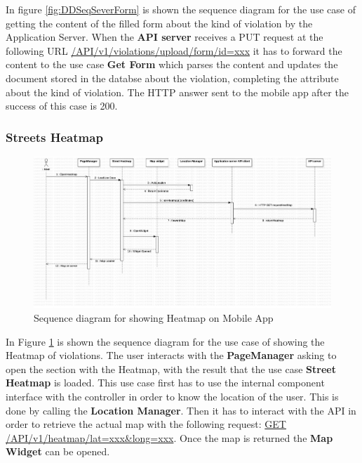In figure \ref{fig:DDSeqSeverForm} is shown the sequence diagram for the use case of getting the content of the filled form about the kind of violation by the Application Server. When the \textbf{API server} receives a PUT request at the following URL \url{/API/v1/violations/upload/form/id=xxx} it has to forward the content to the use case \textbf{Get Form} which parses the content and updates the document stored in the databse about the violation, completing the attribute about the kind of violation. The HTTP answer sent to the mobile app after the success of this case is \textcolor{poliblue}{200}.



\subsubsection{Streets Heatmap}%
\begin{figure}[H]
\centering
\includegraphics[width=\textwidth]{Images/DDSeqAppMap.png}
\caption{\label{fig:DDSeqAppMap} Sequence diagram for showing Heatmap on Mobile App}
\end{figure}

In Figure \ref{fig:DDSeqAppMap} is shown the sequence diagram for the use case of showing the Heatmap of violations.
The user interacts with the \textbf{PageManager} asking to open the section with the Heatmap, with the result that the use case \textbf{Street Heatmap} is loaded. This use case first has to use the internal component interface with the controller in order to know the location of the user. This is done by calling the \textbf{Location Manager}. Then it has to interact with the API in order to retrieve the actual map with the following request: \url{GET} \url{/API/v1/heatmap/lat=xxx&long=xxx}.
Once the map is returned the \textbf{Map Widget} can be opened.

